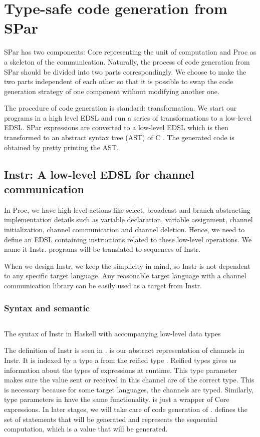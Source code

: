 \chapter{Type-safe code generation from SPar} \label{chap:cg}
SPar has two components: Core representing the unit of computation and Proc as a skeleton of the communication. Naturally, the process of code generation from SPar should be divided into two parts correspondingly. We choose to make the two parts independent of each other so that it is possible to swap the code generation strategy of one component without modifying another one.

The procedure of code generation is standard: transformation. We start our programs in a high level EDSL and run a series of transformations to a low-level EDSL. SPar expressions are converted to a low-level EDSL which is then transformed to an abstract syntax tree (AST) of C \cite{LanguagecAnalysisGeneration}. The generated code is obtained by pretty printing the AST.
\section{Instr: A low-level EDSL for channel communication} \label{codegen:sec:instr}
In Proc, we have high-level actions like select, broadcast and branch abstracting implementation details such as variable declaration, variable assignment, channel initialization, channel communication and channel deletion. Hence, we need to define an EDSL containing instructions related to these low-level operations. We name it Instr. programs will be translated to sequences of Instr. 

When we design Instr, we keep the simplicity in mind, so Instr is not dependent to any specific target language. Any reasonable target language with a channel communication library can be easily used as a target from Instr.

\subsection{Syntax and semantic}
\begin{listing}
    \inputminted{Haskell}{codegen/instr.hs} 
    \caption{The syntax of Instr in Haskell with accompanying low-level data types}
    \label{codegen:code:instr}
\end{listing}
The definition of Instr is seen in .  is our abstract representation of channels in Instr. It is indexed by a type a from the reified type . Reified types gives us information about the types of expressions at runtime. This type parameter makes sure the value sent or received in this channel are of the correct type. This is necessary because for some target languages, the channels are typed. Similarly, type parameters in  have the same functionality.  is just a wrapper of Core expressions. In later stages, we will take care of code generation of .  defines the set of statements that will be generated and  represents the sequential computation, which is a value that will be generated.

